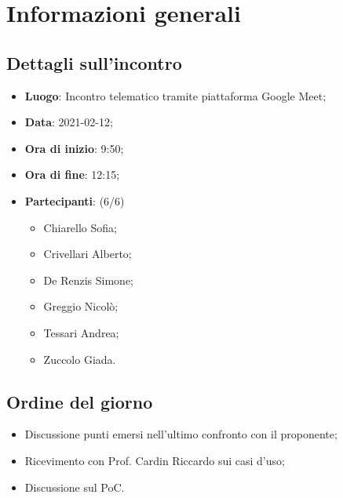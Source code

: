 \section{Informazioni generali}

\subsection{Dettagli sull'incontro}
\begin{itemize}
\item \textbf{Luogo}: Incontro telematico tramite piattaforma Google Meet;
\item \textbf{Data}: 2021-02-12;
\item \textbf{Ora di inizio}: 9:50;
\item \textbf{Ora di fine}: 12:15;
\item \textbf{Partecipanti}: (6/6)
\begin{itemize}
	\item Chiarello Sofia;
    \item Crivellari Alberto;
    \item De Renzis Simone;
    \item Greggio Nicolò;
    \item Tessari Andrea;
    \item Zuccolo Giada.
\end{itemize}
\end{itemize}

\subsection{Ordine del giorno}
\begin{itemize}
	\item Discussione punti emersi nell'ultimo confronto con il proponente;
	\item Ricevimento con Prof. Cardin Riccardo sui casi d'uso;
	\item Discussione sul PoC.
\end{itemize}


